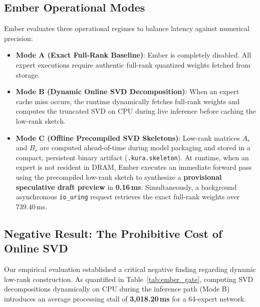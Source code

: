 \subsection{Ember Operational Modes}
Ember evaluates three operational regimes to balance latency against numerical precision:
\begin{itemize}
    \item \textbf{Mode A (Exact Full-Rank Baseline)}: Ember is completely disabled. All expert executions require authentic full-rank quantized weights fetched from storage.
    \item \textbf{Mode B (Dynamic Online SVD Decomposition)}: When an expert cache miss occurs, the runtime dynamically fetches full-rank weights and computes the truncated SVD on CPU during live inference before caching the low-rank sketch.
    \item \textbf{Mode C (Offline Precompiled SVD Skeletons)}: Low-rank matrices $A_r$ and $B_r$ are computed ahead-of-time during model packaging and stored in a compact, persistent binary artifact (\texttt{.kura.skeleton}). At runtime, when an expert is not resident in DRAM, Ember executes an immediate forward pass using the precompiled low-rank sketch to synthesize a \textbf{provisional speculative draft preview} in \textbf{0.16\,ms}. Simultaneously, a background asynchronous \texttt{io\_uring} request retrieves the exact full-rank weights over $739.40$\,ms.
\end{itemize}

\subsection{Negative Result: The Prohibitive Cost of Online SVD}
Our empirical evaluation established a critical negative finding regarding dynamic low-rank construction. As quantified in Table~\ref{tab:ember_gate}, computing SVD decompositions dynamically on CPU during the inference path (Mode B) introduces an average processing stall of \textbf{3,018.20\,ms} for a 64-expert network. 

\begin{table}[h]
\caption{Ember operational gate metrics evaluated on commodity host hardware. Online SVD computation introduces an intolerable 3-second bottleneck, while precompiled skeletons supply sub-millisecond provisional previews at minor quality divergence.}
\label{tab:ember_gate}
\centering
{}
\end{table}

